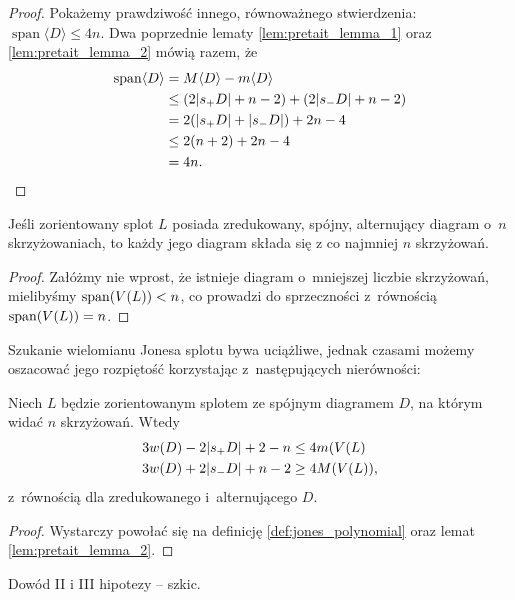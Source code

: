 \begin{proof}
    Pokażemy prawdziwość innego, równoważnego stwierdzenia: $\operatorname{span} \langle D\rangle\le 4n$.
    Dwa poprzednie lematy \ref{lem:pretait_lemma_1} oraz \ref{lem:pretait_lemma_2} mówią razem, że
    \begin{align}
        \operatorname{span}\langle D\rangle
        & = M\langle D\rangle - m\langle D\rangle \\
        & \le (2|s_+D|+n-2)+(2|s_-D|+n-2) \\
        & = 2(|s_+D|+|s_- D|)+2n-4 \\
        & \le 2(n+2)+2n-4 \\
        & = 4n. \qedhere
    \end{align}
\end{proof}

\begin{conjecture}[Tait]
    Jeśli zorientowany splot $L$ posiada zredukowany, spójny, alternujący diagram o~$n$ skrzyżowaniach, to każdy jego diagram składa się z co najmniej $n$ skrzyżowań.
\end{conjecture}

\begin{proof}
    Załóżmy nie wprost, że istnieje diagram o~mniejszej liczbie skrzyżowań,
    mielibyśmy $\operatorname{span} (V(L)) < n$, co prowadzi do sprzeczności z~równością $\operatorname{span} (V(L)) = n$.
\end{proof}

Szukanie wielomianu Jonesa splotu bywa uciążliwe,
jednak czasami możemy oszacować jego rozpiętość korzystając z~następujących nierówności:

\begin{corollary}
    Niech $L$ będzie zorientowanym splotem ze spójnym diagramem $D$, na którym widać $n$ skrzyżowań.
    Wtedy
    \begin{align}
        3w(D) - 2|s_+D| + 2 - n & \le 4 m(V(L) \\
        3w(D) + 2|s_-D| + n - 2 & \ge 4 M(V(L)),
    \end{align}
    z~równością dla zredukowanego i~alternującego $D$.
\end{corollary}

\begin{proof}
    Wystarczy powołać się na definicję \ref{def:jones_polynomial} oraz lemat \ref{lem:pretait_lemma_2}.
\end{proof}

\begin{tobedone}
    Dowód II i III hipotezy -- szkic.
\end{tobedone}

